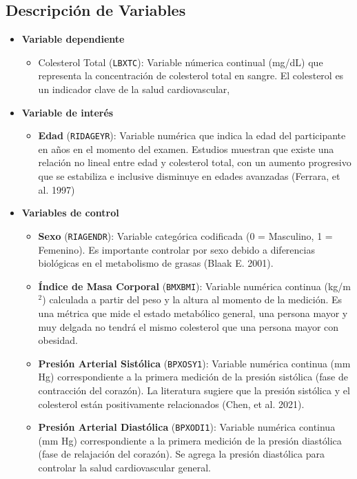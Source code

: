 \subsection{Descripción de Variables}
\begin{itemize}
    \item \textbf{Variable dependiente} 
    \begin{itemize}
        \item Colesterol Total (\texttt{LBXTC}): Variable númerica continual (mg/dL) que representa la concentración de colesterol total en sangre. El colesterol es un indicador clave de la salud cardiovascular, 
    \end{itemize}

    \item \textbf{Variable de interés} 
    \begin{itemize}
        \item \textbf{Edad} (\texttt{RIDAGEYR}): Variable numérica que indica la edad del participante en años en el momento del examen. Estudios muestran que existe una relación no lineal entre edad y colesterol total, con un aumento progresivo que se estabiliza e inclusive disminuye en edades avanzadas (Ferrara, et al. 1997)
    \end{itemize}
    \item \textbf{Variables de control}
    \begin{itemize}
        \item \textbf{Sexo} (\texttt{RIAGENDR}): Variable categórica codificada (0 = Masculino, 1 = Femenino). Es importante controlar por sexo debido a diferencias biológicas en el metabolismo de grasas (Blaak E. 2001).
        \item \textbf{Índice de Masa Corporal} (\texttt{BMXBMI}): Variable numérica continua (kg/m$^2$) calculada a partir del peso y la altura al momento de la medición. Es una métrica que mide el estado metabólico general, una persona mayor y muy delgada no tendrá el mismo colesterol que una persona mayor con obesidad. 
        \item \textbf{Presión Arterial Sistólica} (\texttt{BPXOSY1}): Variable numérica continua (mm Hg) correspondiente a la primera medición de la presión sistólica (fase de contracción del corazón). La literatura sugiere que la presión sistólica y el colesterol están positivamente relacionados (Chen, et al. 2021).
        \item \textbf{Presión Arterial Diastólica} (\texttt{BPXODI1}): Variable numérica continua (mm Hg) correspondiente a la primera medición de la presión diastólica (fase de relajación del corazón). Se agrega la presión diastólica para controlar la salud cardiovascular general. 
    \end{itemize}
    
\end{itemize}

